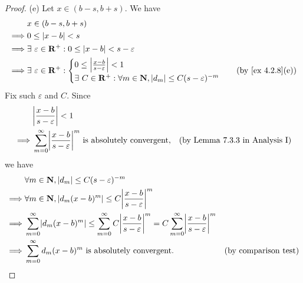 \begin{proof}{(e)}
  Let \(x \in (b - s, b + s)\).
  We have
  \begin{align*}
             & x \in (b - s, b + s)                                                                                           \\
    \implies & 0 \leq \abs{x - b} < s                                                                                         \\
    \implies & \exists\ \varepsilon \in \R^+ : 0 \leq \abs{x - b} < s - \varepsilon                                           \\
    \implies & \exists\ \varepsilon \in \R^+ : \begin{cases}
                                                 0 \leq \abs{\frac{x - b}{s - \varepsilon}} < 1 \\
                                                 \exists\ C \in \R^+ : \forall m \in \N, \abs{d_m} \leq C (s - \varepsilon)^{-m}
                                               \end{cases} & \text{(by \cref{ex 4.2.8}(e))}
  \end{align*}
  Fix such \(\varepsilon\) and \(C\).
  Since
  \begin{align*}
             & \abs{\frac{x - b}{s - \varepsilon}} < 1                                                                                             \\
    \implies & \sum_{m = 0}^\infty \abs{\frac{x - b}{s - \varepsilon}}^m \text{ is absolutely convergent}, & \text{(by Lemma 7.3.3 in Analysis I)}
  \end{align*}
  we have
  \begin{align*}
             & \forall m \in \N, \abs{d_m} \leq C (s - \varepsilon)^{-m}                                                                                                                                                \\
    \implies & \forall m \in \N, \abs{d_m (x - b)^m} \leq C \abs{\frac{x - b}{s - \varepsilon}}^{m}                                                                                                                     \\
    \implies & \sum_{m = 0}^\infty \abs{d_m (x - b)^m} \leq \sum_{m = 0}^\infty C \abs{\frac{x - b}{s - \varepsilon}}^{m} = C \sum_{m = 0}^\infty \abs{\frac{x - b}{s - \varepsilon}}^{m}                               \\
    \implies & \sum_{m = 0}^\infty d_m (x - b)^m \text{ is absolutely convergent}.                                                                                                        & \text{(by comparison test)}

\end{align*}
\end{proof}
